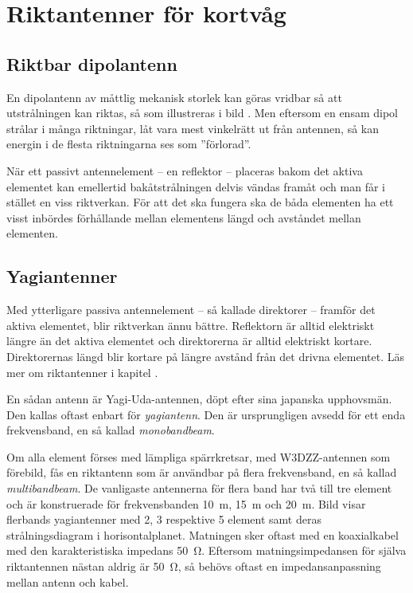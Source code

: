 \section{Riktantenner för kortvåg}

\subsection{Riktbar dipolantenn}


En dipolantenn av måttlig mekanisk storlek kan göras vridbar så att
utstrålningen kan riktas, så som illustreras i bild .
Men eftersom en ensam dipol strålar i många riktningar, låt vara mest vinkelrätt
ut från antennen, så kan energin i de flesta riktningarna ses som ''förlorad''.

När ett passivt antennelement -- en reflektor -- placeras bakom det aktiva
elementet kan emellertid bakåtstrålningen delvis vändas framåt och man får i
stället en viss riktverkan.
För att det ska fungera ska de båda elementen ha ett visst inbördes förhållande
mellan elementens längd och avståndet mellan elementen.


\subsection{Yagiantenner}


Med ytterligare passiva antennelement -- så kallade direktorer -- framför det
aktiva elementet, blir riktverkan ännu bättre.
Reflektorn är alltid elektriskt längre än det aktiva elementet och direktorerna
är alltid elektriskt kortare.
Direktorernas längd blir kortare på längre avstånd från det drivna elementet.
Läs mer om riktantenner i kapitel .

En sådan antenn är Yagi-Uda-antennen, döpt efter sina japanska upphovsmän.
Den kallas oftast enbart för \emph{yagiantenn}.
Den är ursprungligen avsedd för ett enda frekvensband, en så kallad
\emph{monobandbeam}.

Om alla element förses med lämpliga spärrkretsar, med W3DZZ-antennen som
förebild, fås en riktantenn som är användbar på flera frekvensband, en så
kallad \emph{multibandbeam}.
De vanligaste antennerna för flera band har två till tre element och är
konstruerade för frekvensbanden \SI{10}{\metre}, \SI{15}{\metre} och
\SI{20}{\metre}.
Bild  visar flerbands yagiantenner med 2, 3 respektive 5
element samt deras strålningsdiagram i horisontalplanet.
Matningen sker oftast med en koaxialkabel med den karakteristiska impedans
\SI{50}{\ohm}.
Eftersom matningsimpedansen för själva riktantennen nästan aldrig är
\SI{50}{\ohm}, så behövs oftast en impedansanpassning mellan antenn och kabel.

